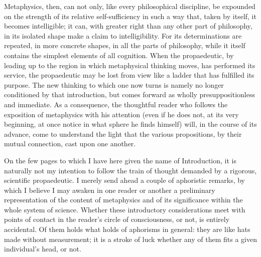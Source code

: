 \documentclass[12pt]{article}
\newcommand{\opage}[1]{\marginnote{\footnotesize\textit{[#1]}}}
\begin{document}
Metaphysics, then, can not only, like every philosophical discipline, be
expounded on the strength of its relative self-sufficiency in such a way that,
taken by itself, it becomes intelligible; it can, with greater right than any
other part of philosophy, in its isolated shape make a claim to intelligibility.
For its determinations are repeated, in more concrete shapes, in all the parts of
philosophy, while it itself contains the simplest elements of all cognition. When
the propaedeutic, by leading up to the region in which metaphysical thinking
moves, has performed its service, the propaedeutic may be lost from view like a
ladder that has fulfilled its purpose. The new thinking to which one now turns is
namely no longer conditioned by that introduction, but comes forward as wholly
presuppositionless and immediate. As a consequence, the thoughtful reader who
follows the exposition of metaphysics with his attention (even if he does not, at
its very beginning, at once notice in what sphere he finds himself) will, in the
course of its advance, come to understand the light that the various propositions,
by their mutual connection, cast upon one another.

\opage{191}On the few pages to which I have here given the name of Introduction,
it is naturally not my intention to follow the train of thought demanded by a
rigorous, scientific propaedeutic. I merely send ahead a couple of aphoristic
remarks, by which I believe I may awaken in one reader or another a preliminary
representation of the content of metaphysics and of its significance within the
whole system of science. Whether these introductory considerations meet with
points of contact in the reader's circle of consciousness, or not, is entirely
accidental. Of them holds what holds of aphorisms in general: they are like hats
made without measurement; it is a stroke of luck whether any of them fits a given
individual's head, or not.
\end{document}
